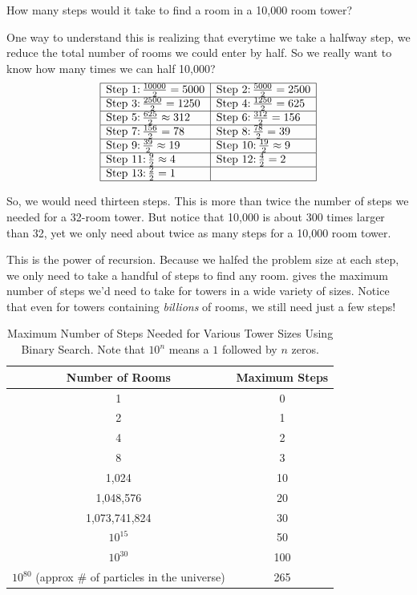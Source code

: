 How many steps would it take to find a room in a 10,000 room tower?

One way to understand this is realizing that everytime we take a halfway step, we reduce the total
number of rooms we could enter by half. So we really want to know how many times we can half 10,000?
\[
\begin{array}{|l|l|}
\hline
\text{Step 1:} \, \frac{10000}{2} = 5000 & \text{Step 2:} \, \frac{5000}{2} = 2500 \\
\hline
\text{Step 3:} \, \frac{2500}{2} = 1250 & \text{Step 4:} \, \frac{1250}{2} = 625 \\
\hline
\text{Step 5:} \, \frac{625}{2} \approx 312 & \text{Step 6:} \, \frac{312}{2} = 156 \\
\hline
\text{Step 7:} \, \frac{156}{2} = 78 & \text{Step 8:} \, \frac{78}{2} = 39 \\
\hline
\text{Step 9:} \, \frac{39}{2} \approx 19 & \text{Step 10:} \, \frac{19}{2} \approx 9 \\
\hline
\text{Step 11:} \, \frac{9}{2} \approx 4 & \text{Step 12:} \, \frac{4}{2} = 2 \\
\hline
\text{Step 13:} \, \frac{2}{2} = 1 & \\
\hline
\end{array}
\]

So, we would need thirteen steps. This is more than twice the number of steps we needed for a
32-room tower. But notice that 10,000 is about 300 times larger than 32, yet we only need about twice
as many steps for a 10,000 room tower.

This is the power of recursion. Because we halfed the problem size at each step, we only need to
take a handful of steps to find any room.  gives the maximum number of
steps we'd need to take for towers in a wide variety of sizes. Notice that even for towers
containing \emph{billions} of rooms, we still need just a few steps!

\begin{table}[ht]
    \centering
    \caption{Maximum Number of Steps Needed for Various Tower Sizes Using Binary Search. Note that $10^{n}$ means a $1$ followed by $n$ zeros.}
    \label{tab:logarithms}
    \begin{tabular}{|c|c|}
        \hline
        \textbf{Number of Rooms} & \textbf{Maximum Steps} \\
        \hline
        1 & 0 \\
        2 & 1 \\
        4 & 2 \\
        8 & 3 \\
        1,024 & 10 \\
        1,048,576 & 20 \\
        1,073,741,824 & 30 \\
        $10^{15}$ & 50 \\
        $10^{30}$ & 100 \\
        $10^{80}$ (approx \# of particles in the universe) & 265 \\
        \hline
    \end{tabular}
\end{table}
